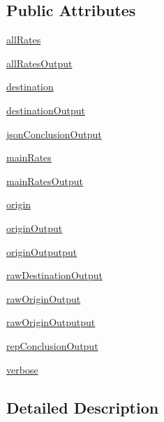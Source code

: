 \subsection*{Public Attributes}
\begin{DoxyCompactItemize}
\item 
\hyperlink{classe2e_1_1_parameters_a60eeea35185af8b13a6ea9d797a38dc7}{all\+Rates}
\item 
\hyperlink{classe2e_1_1_parameters_ac5dfd879a297879921d905de68f7febb}{all\+Rates\+Output}
\item 
\hyperlink{classe2e_1_1_parameters_ad2cdf746b8890c53a9cab6fd7df7043b}{destination}
\item 
\hyperlink{classe2e_1_1_parameters_a3b4ae5aa9b73466e51018b6f37792577}{destination\+Output}
\item 
\hyperlink{classe2e_1_1_parameters_a20ca05e6261a929f4a07b937ccce40af}{json\+Conclusion\+Output}
\item 
\hyperlink{classe2e_1_1_parameters_aaa2b41d7017ab4893bbe27fa8edb7180}{main\+Rates}
\item 
\hyperlink{classe2e_1_1_parameters_a552470d8541b7caf2bb8940e32a6fe0e}{main\+Rates\+Output}
\item 
\hyperlink{classe2e_1_1_parameters_aff4d7aaa35295f7f71e546fe5554c4d9}{origin}
\item 
\hyperlink{classe2e_1_1_parameters_ab1ac2fc0ab2f3ef169b776c776cdb225}{origin\+Output}
\item 
\hyperlink{classe2e_1_1_parameters_acece0ee5caaa6322c3a337c3b7f00599}{origin\+Outputput}
\item 
\hyperlink{classe2e_1_1_parameters_a84b319098084ed505e089a600e154f6e}{raw\+Destination\+Output}
\item 
\hyperlink{classe2e_1_1_parameters_a62b586d9863422872833e34814ac51e6}{raw\+Origin\+Output}
\item 
\hyperlink{classe2e_1_1_parameters_a363d9432d8f2bdcf645fa39b81e007f3}{raw\+Origin\+Outputput}
\item 
\hyperlink{classe2e_1_1_parameters_a75609904252351f2d42c659c6f77b83a}{rep\+Conclusion\+Output}
\item 
\hyperlink{classe2e_1_1_parameters_a84d862bf507bb0325f5daf3b7e5d9ab3}{verbose}
\end{DoxyCompactItemize}


\subsection{Detailed Description}


